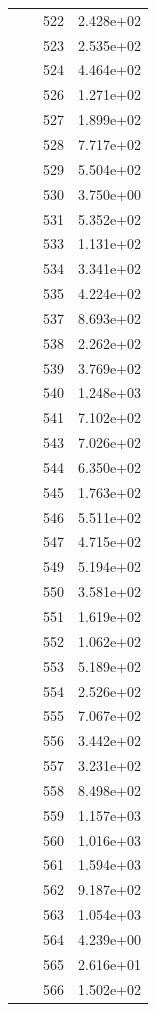 \documentclass[12pt]{article}
\begin{document}
\begin{longtable}{@{}cccc@{}}
 &  & 522 & 2.428e+02 \\
 &  & 523 & 2.535e+02 \\
 &  & 524 & 4.464e+02 \\
 &  & 526 & 1.271e+02 \\
 &  & 527 & 1.899e+02 \\
 &  & 528 & 7.717e+02 \\
 &  & 529 & 5.504e+02 \\
 &  & 530 & 3.750e+00 \\
 &  & 531 & 5.352e+02 \\
 &  & 533 & 1.131e+02 \\
 &  & 534 & 3.341e+02 \\
 &  & 535 & 4.224e+02 \\
 &  & 537 & 8.693e+02 \\
 &  & 538 & 2.262e+02 \\
 &  & 539 & 3.769e+02 \\
 &  & 540 & 1.248e+03 \\
 &  & 541 & 7.102e+02 \\
 &  & 543 & 7.026e+02 \\
 &  & 544 & 6.350e+02 \\
 &  & 545 & 1.763e+02 \\
 &  & 546 & 5.511e+02 \\
 &  & 547 & 4.715e+02 \\
 &  & 549 & 5.194e+02 \\
 &  & 550 & 3.581e+02 \\
 &  & 551 & 1.619e+02 \\
 &  & 552 & 1.062e+02 \\
 &  & 553 & 5.189e+02 \\
 &  & 554 & 2.526e+02 \\
 &  & 555 & 7.067e+02 \\
 &  & 556 & 3.442e+02 \\
 &  & 557 & 3.231e+02 \\
 &  & 558 & 8.498e+02 \\
 &  & 559 & 1.157e+03 \\
 &  & 560 & 1.016e+03 \\
 &  & 561 & 1.594e+03 \\
 &  & 562 & 9.187e+02 \\
 &  & 563 & 1.054e+03 \\
 &  & 564 & 4.239e+00 \\
 &  & 565 & 2.616e+01 \\
 &  & 566 & 1.502e+02 \\

\end{longtable}
\end{document}
